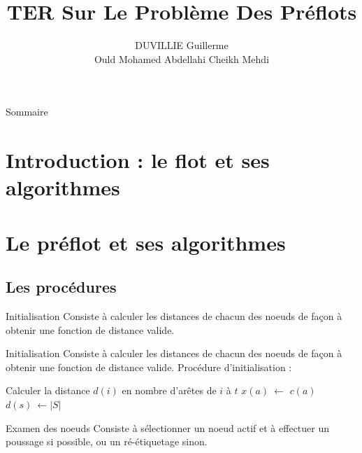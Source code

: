 \documentclass[hyperref={},
xcolor={dvipsnames,svgnames,table},10pt]{beamer}
\title{TER Sur Le Problème Des Préflots}
\author{DUVILLIE Guillerme \\ Ould Mohamed Abdellahi Cheikh Mehdi}
\institute{Université Montpellier2\\ Master1-Informatique\\ Spécialité-MOCA}
\begin{document}
\begin{frame}
	\titlepage 
\end{frame}


\begin{frame}{Sommaire}
  \tableofcontents
\end{frame} 

\section{Introduction : le flot et ses algorithmes}



\section{Le préflot et ses algorithmes}



\subsection{Les procédures}

\begin{frame}{Initialisation}
	Consiste à calculer les distances de chacun des noeuds de façon à obtenir une fonction de distance
	valide.\vfill
\end{frame}

\begin{frame}{Initialisation}
	Consiste à calculer les distances de chacun des noeuds de façon à obtenir une fonction de distance
	valide.\vfill
	Procédure d'initialisation : 
	\begin{algorithmic}[1]
				\STATE Calculer la distance $d(i)$ en nombre d'arêtes de $i$ à $t$  
			\ENDFOR
				\STATE $x(a)\ \leftarrow$ $c(a)$  
			\ENDFOR
			\STATE $d(s)\ \leftarrow |S|$ 
	\end{algorithmic}
\end{frame}

\begin{frame}{Examen des noeuds}
	Consiste à sélectionner un noeud actif et à effectuer un poussage si possible, ou un ré-étiquetage
	sinon. \vfill
\end{frame}
\end{document}
